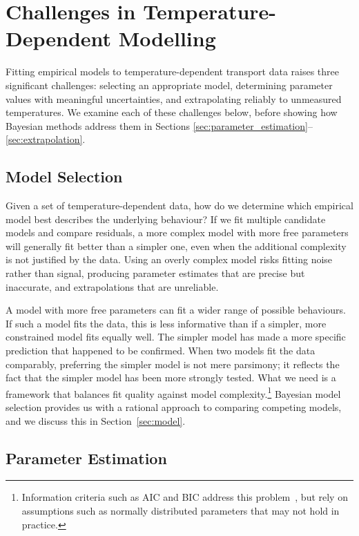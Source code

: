 \documentclass[reprint,superscriptaddress,nobibnotes,nofootinbib,amsmath,amssymb,aps,hidelinks]{revtex4-2}
\begin{document}
\section{Challenges in Temperature-Dependent Modelling}
\label{sec:problems}

Fitting empirical models to temperature-dependent transport data raises three significant challenges: selecting an appropriate model, determining parameter values with meaningful uncertainties, and extrapolating reliably to unmeasured temperatures. 
We examine each of these challenges below, before showing how Bayesian methods address them in Sections \ref{sec:parameter_estimation}--\ref{sec:extrapolation}.

\subsection{Model Selection}

Given a set of temperature-dependent data, how do we determine which empirical model best describes the underlying behaviour? 
If we fit multiple candidate models and compare residuals, a more complex model with more free parameters will generally fit better than a simpler one, even when the additional complexity is not justified by the data. 
Using an overly complex model risks fitting noise rather than signal, producing parameter estimates that are precise but inaccurate, and extrapolations that are unreliable.

A model with more free parameters can fit a wider range of possible behaviours. 
If such a model fits the data, this is less informative than if a simpler, more constrained model fits equally well. 
The simpler model has made a more specific prediction that happened to be confirmed. 
When two models fit the data comparably, preferring the simpler model is not mere parsimony; it reflects the fact that the simpler model has been more strongly tested.
What we need is a framework that balances fit quality against model complexity.\footnote{Information criteria such as AIC and BIC address this problem~\cite{Akaike1974, Schwarz1978}, but rely on assumptions such as normally distributed parameters that may not hold in practice.}
Bayesian model selection provides us with a rational approach to comparing competing models, and we discuss this in Section~\ref{sec:model}.

\subsection{Parameter Estimation}
\end{document}
